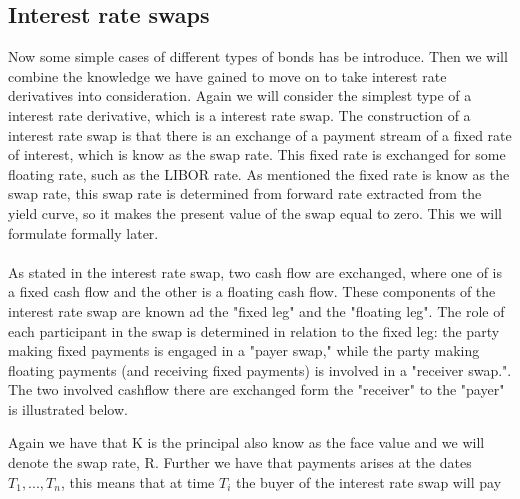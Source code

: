 \subsection{Interest rate swaps}
Now some simple cases of different types of bonds has be introduce. Then we will combine the knowledge we have gained to move on
to take interest rate derivatives into consideration. Again we will consider the simplest type of a interest rate derivative, which is a
interest rate swap. The construction of a interest rate swap is that there is an  exchange of a payment stream of a fixed rate of interest,
which is know as the swap rate. This fixed rate is exchanged for some floating rate, such as the LIBOR rate. 
As mentioned the fixed rate is know as the swap rate, this swap rate is determined from forward rate extracted from the yield curve, 
so it makes the present value of the swap equal to zero. This we will formulate formally later. 
\\\\
As stated in the interest rate swap, two cash flow are exchanged, where one of is a 
fixed cash flow and the other is a floating cash flow. These components of
the interest rate swap are known ad the "fixed leg" and the "floating leg". 
The role of each participant in the swap is determined in relation to the 
fixed leg: the party making fixed payments is engaged in a "payer swap," 
while the party making floating payments (and receiving fixed payments) is
involved in a "receiver swap.". The two involved cashflow there are exchanged form the "receiver" to the "payer" is illustrated below.
\\
\begin{center}
\end{center} 
\noindent
Again we have that K is the principal also know as the face value and we will denote the swap rate, R.
Further we have that payments
arises at the dates $T_1,...,T_n$, this means that at time $T_i$ the buyer of the interest rate swap will pay
